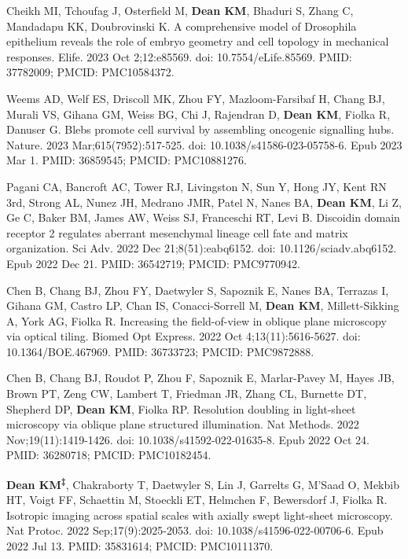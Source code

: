\begin{etaremune}
\item Cheikh MI, Tchoufag J, Osterfield M, \textbf{Dean KM}, Bhaduri S, Zhang C, Mandadapu KK, Doubrovinski K. A comprehensive model of Drosophila epithelium reveals the role of embryo geometry and cell topology in mechanical responses. Elife. 2023 Oct 2;12:e85569. doi: 10.7554/eLife.85569. PMID: 37782009; PMCID: PMC10584372.

\item Weems AD, Welf ES, Driscoll MK, Zhou FY, Mazloom-Farsibaf H, Chang BJ, Murali VS, Gihana GM, Weiss BG, Chi J, Rajendran D, \textbf{Dean KM}, Fiolka R, Danuser G. Blebs promote cell survival by assembling oncogenic signalling hubs. Nature. 2023 Mar;615(7952):517-525. doi: 10.1038/s41586-023-05758-6. Epub 2023 Mar 1. PMID: 36859545; PMCID: PMC10881276.

\item Pagani CA, Bancroft AC, Tower RJ, Livingston N, Sun Y, Hong JY, Kent RN 3rd, Strong AL, Nunez JH, Medrano JMR, Patel N, Nanes BA, \textbf{Dean KM}, Li Z, Ge C, Baker BM, James AW, Weiss SJ, Franceschi RT, Levi B. Discoidin domain receptor 2 regulates aberrant mesenchymal lineage cell fate and matrix organization. Sci Adv. 2022 Dec 21;8(51):eabq6152. doi: 10.1126/sciadv.abq6152. Epub 2022 Dec 21. PMID: 36542719; PMCID: PMC9770942.

\item Chen B, Chang BJ, Zhou FY, Daetwyler S, Sapoznik E, Nanes BA, Terrazas I, Gihana GM, Castro LP, Chan IS, Conacci-Sorrell M, \textbf{Dean KM}, Millett-Sikking A, York AG, Fiolka R. Increasing the field-of-view in oblique plane microscopy via optical tiling. Biomed Opt Express. 2022 Oct 4;13(11):5616-5627. doi: 10.1364/BOE.467969. PMID: 36733723; PMCID: PMC9872888.

\item Chen B, Chang BJ, Roudot P, Zhou F, Sapoznik E, Marlar-Pavey M, Hayes JB, Brown PT, Zeng CW, Lambert T, Friedman JR, Zhang CL, Burnette DT, Shepherd DP, \textbf{Dean KM}, Fiolka RP. Resolution doubling in light-sheet microscopy via oblique plane structured illumination. Nat Methods. 2022 Nov;19(11):1419-1426. doi: 10.1038/s41592-022-01635-8. Epub 2022 Oct 24. PMID: 36280718; PMCID: PMC10182454.

\item \textbf{Dean KM\textsuperscript{‡}}, Chakraborty T, Daetwyler S, Lin J, Garrelts G, M'Saad O, Mekbib HT, Voigt FF, Schaettin M, Stoeckli ET, Helmchen F, Bewersdorf J, Fiolka R. Isotropic imaging across spatial scales with axially swept light-sheet microscopy. Nat Protoc. 2022 Sep;17(9):2025-2053. doi: 10.1038/s41596-022-00706-6. Epub 2022 Jul 13. PMID: 35831614; PMCID: PMC10111370.


\end{etaremune}
